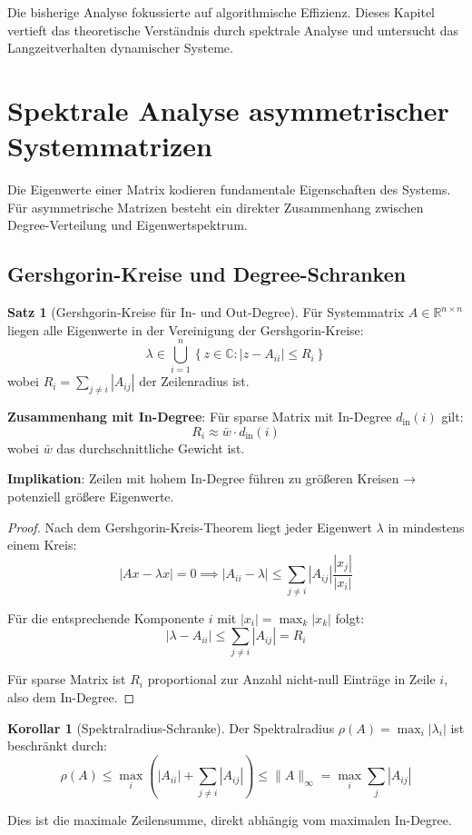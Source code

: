 \documentclass[a4paper,12pt]{report}
\theoremstyle{definition}
\newtheorem{satz}{Satz}
\newtheorem{korollar}{Korollar}
\begin{document}
	Die bisherige Analyse fokussierte auf algorithmische Effizienz. Dieses Kapitel vertieft das theoretische Verständnis durch spektrale Analyse und untersucht das Langzeitverhalten dynamischer Systeme.
	
	\section{Spektrale Analyse asymmetrischer Systemmatrizen}
	
	Die Eigenwerte einer Matrix kodieren fundamentale Eigenschaften des Systems. Für asymmetrische Matrizen besteht ein direkter Zusammenhang zwischen Degree-Verteilung und Eigenwertspektrum.
	
	\subsection{Gershgorin-Kreise und Degree-Schranken}
	
	\begin{satz}[Gershgorin-Kreise für In- und Out-Degree]
		Für Systemmatrix $A \in \mathbb{R}^{n \times n}$ liegen alle Eigenwerte in der Vereinigung der Gershgorin-Kreise:
		\[
		\lambda \in \bigcup_{i=1}^n \left\{ z \in \mathbb{C} : |z - A_{ii}| \leq R_i \right\}
		\]
		wobei $R_i = \sum_{j \neq i} |A_{ij}|$ der Zeilenradius ist.
		
		\textbf{Zusammenhang mit In-Degree}:
		Für sparse Matrix mit In-Degree $d_{\text{in}}(i)$ gilt:
		\[
		R_i \approx \bar{w} \cdot d_{\text{in}}(i)
		\]
		wobei $\bar{w}$ das durchschnittliche Gewicht ist.
		
		\textbf{Implikation}: Zeilen mit hohem In-Degree führen zu größeren Kreisen → potenziell größere Eigenwerte.
	\end{satz}
	
	\begin{proof}
		Nach dem Gershgorin-Kreis-Theorem liegt jeder Eigenwert $\lambda$ in mindestens einem Kreis:
		\[
		|Ax - \lambda x| = 0 \implies |A_{ii} - \lambda| \leq \sum_{j \neq i} |A_{ij}| \frac{|x_j|}{|x_i|}
		\]
		
		Für die entsprechende Komponente $i$ mit $|x_i| = \max_k |x_k|$ folgt:
		\[
		|\lambda - A_{ii}| \leq \sum_{j \neq i} |A_{ij}| = R_i
		\]
		
		Für sparse Matrix ist $R_i$ proportional zur Anzahl nicht-null Einträge in Zeile $i$, also dem In-Degree.
	\end{proof}
	
	\begin{korollar}[Spektralradius-Schranke]
		Der Spektralradius $\rho(A) = \max_i |\lambda_i|$ ist beschränkt durch:
		\[
		\rho(A) \leq \max_i \left( |A_{ii}| + \sum_{j \neq i} |A_{ij}| \right) \leq \|A\|_{\infty} = \max_i \sum_j |A_{ij}|
		\]
		
		Dies ist die maximale Zeilensumme, direkt abhängig vom maximalen In-Degree.
	\end{korollar}
	
\end{document}
